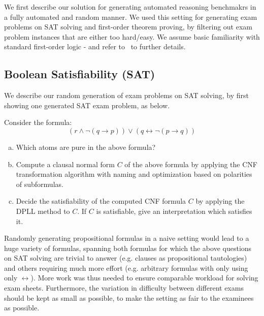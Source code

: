 We first describe our solution for generating automated reasoning
benchmakrs in a fully automated and random manner. We used this
setting for generating exam problems on SAT solving and first-order
theorem proving, by 
 filtering out exam problem instances that are either too
 hard/easy. We assume basic familiarity with standard first-order
 logic - and refer to~\cite{SAT09,Vampire13} to further details.

 \subsection{Boolean Satisfiability (SAT)}\label{sec:sat}
We describe our random generation of exam problems on SAT solving, by
first 
showing  one generated SAT exam problem, as 
below.

\begin{mdframed}
    \begin{example}\label{ex:sat}
        Consider the formula:
        \[
            ( r \land \lnot ( q \rightarrow p ) ) \lor ( q \leftrightarrow \lnot ( p \rightarrow q ) )
        \]
        \begin{enumerate}[(a)]
            \item
                Which atoms are pure in the above formula?
            \item\label{subtask:sat-cnf}
                Compute a clausal normal form $C$ of the above formula by
                applying the CNF transformation algorithm with naming and
                optimization based on polarities of subformulas.
            \item
                Decide the satisfiability of the computed CNF formula $C$
                by applying the DPLL method to $C$. If $C$ is
                satisfiable, give an interpretation which
                satisfies it.
        \end{enumerate}
    \end{example}
\end{mdframed}

 
Randomly generating propositional formulas in a naive setting would lead
to a huge variety of formulas,
spanning both formulas for which the above questions on SAT solving
are trivial to answer (e.g. clauses as propositional tautologies)
and others requiring much more effort  (e.g. arbitrary formulas with
only using only $\leftrightarrow$). More work was thus needed to
ensure comparable workload for solving exam sheets. 
Furthermore,
the variation in difficulty between different exams should be kept as small as possible,
to make the setting as fair to the examinees as possible.

